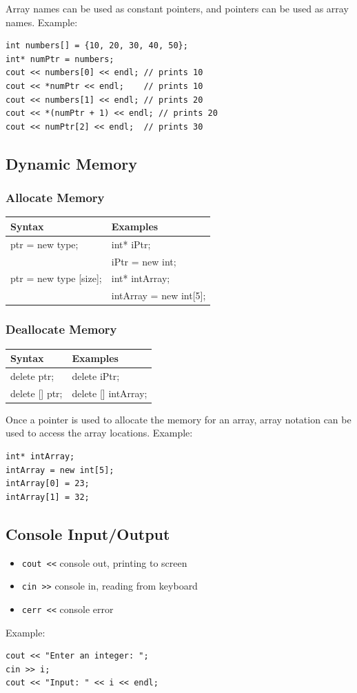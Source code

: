 \documentclass{article}
\begin{document}
Array names can be used as constant pointers, and pointers can be used as array names.
Example:
\begin{verbatim}
int numbers[] = {10, 20, 30, 40, 50};
int* numPtr = numbers;
cout << numbers[0] << endl; // prints 10
cout << *numPtr << endl;    // prints 10
cout << numbers[1] << endl; // prints 20
cout << *(numPtr + 1) << endl; // prints 20
cout << numPtr[2] << endl;  // prints 30
\end{verbatim}

\subsection*{Dynamic Memory}
\subsubsection*{Allocate Memory}
\begin{tabular}{|l|l|}
\hline
\textbf{Syntax} & \textbf{Examples} \\
\hline
ptr = new type; & int* iPtr; \\
 & iPtr = new int; \\
\hline
ptr = new type [size]; & int* intArray; \\
 & intArray = new int[5]; \\
\hline
\end{tabular}

\subsubsection*{Deallocate Memory}
\begin{tabular}{|l|l|}
\hline
\textbf{Syntax} & \textbf{Examples} \\
\hline
delete ptr; & delete iPtr; \\
\hline
delete [] ptr; & delete [] intArray; \\
\hline
\end{tabular}
Once a pointer is used to allocate the memory for an array, array notation can be used to access the array locations.
Example:
\begin{verbatim}
int* intArray;
intArray = new int[5];
intArray[0] = 23;
intArray[1] = 32;
\end{verbatim}

\subsection*{Console Input/Output}
\begin{itemize}
    \item \texttt{cout <<} console out, printing to screen
    \item \texttt{cin >>} console in, reading from keyboard
    \item \texttt{cerr <<} console error
\end{itemize}
Example:
\begin{verbatim}
cout << "Enter an integer: ";
cin >> i;
cout << "Input: " << i << endl;
\end{verbatim}
\end{document}
